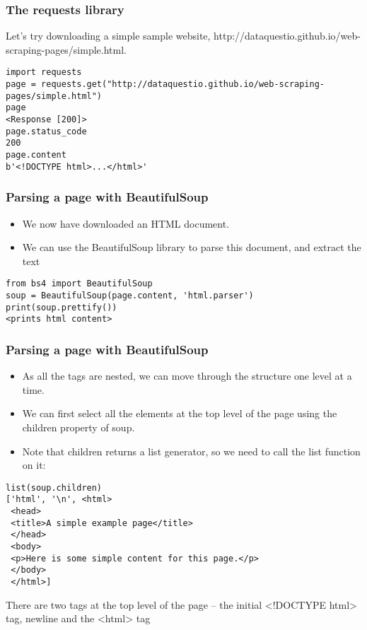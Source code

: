\begin{frame}[fragile]\frametitle{The requests library}
Let's try downloading a simple sample website, http://dataquestio.github.io/web-scraping-pages/simple.html.
    \begin{lstlisting}
import requests
page = requests.get("http://dataquestio.github.io/web-scraping-pages/simple.html")
page
<Response [200]>
page.status_code
200
page.content
b'<!DOCTYPE html>...</html>'
\end{lstlisting}
\end{frame}


\begin{frame}[fragile]\frametitle{Parsing a page with BeautifulSoup}
    \begin{itemize}
    \item We now have downloaded an HTML document.
    \item We can use the BeautifulSoup library to parse this document, and extract the text 
    \end{itemize}
        \begin{lstlisting}
from bs4 import BeautifulSoup
soup = BeautifulSoup(page.content, 'html.parser')
print(soup.prettify())
<prints html content>
\end{lstlisting}
\end{frame}

\begin{frame}[fragile]\frametitle{Parsing a page with BeautifulSoup}
    \begin{itemize}
    \item As all the tags are nested, we can move through the structure one level at a time. 
    \item We can first select all the elements at the top level of the page using the children property of soup. 
    \item Note that children returns a list generator, so we need to call the list function on it:
    \end{itemize}
        \begin{lstlisting}
list(soup.children)
['html', '\n', <html>
 <head>
 <title>A simple example page</title>
 </head>
 <body>
 <p>Here is some simple content for this page.</p>
 </body>
 </html>]
\end{lstlisting}
There are two tags at the top level of the page -- the initial <!DOCTYPE html> tag, newline and the <html> tag
\end{frame}

